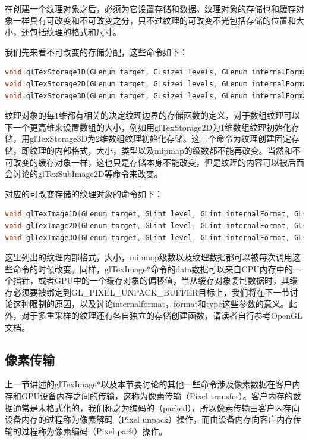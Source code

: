 在创建一个纹理对象之后，必须为它设置存储和数据。纹理对象的存储也和缓存对象一样具有可改变和不可改变之分，只不过纹理的可改变不光包括存储的位置和大小，还包括纹理的格式和尺寸。

我们先来看不可改变的存储分配，这些命令如下：

\begin{lstlisting}[language=C++]
void glTexStorage1D(GLenum target, GLsizei levels, GLenum internalFormat, GLsizei width);
void glTexStorage2D(GLenum target, GLsizei levels, GLenum internalFormat, GLsizei width, GLsizei height);
void glTexStorage3D(GLenum target, GLsizei levels, GLenum internalFormat, GLsizei width, GLsizei height, GLsizei depth);
\end{lstlisting}

纹理对象的每1维都有相关的决定纹理边界的存储函数的定义，对于数组纹理可以下一个更高维来设置数组的大小，例如用glTexStorage2D为1维数组纹理初始化存储，用glTexStorage3D为2维数组纹理初始化存储。这三个命令为纹理创建固定存储，即纹理的内部格式，大小，类型以及mipmap的级数都不能再改变。当然和不可改变的缓存对象一样，这也只是存储本身不能改变，但是纹理的内容可以被后面会讨论的glTexSubImage2D等命令来改变。

对应的可改变存储的纹理对象的命令如下：

\begin{lstlisting}[language=C++]
void glTexImage1D(GLenum target, GLint level, GLint internalFormat, GLsizei width, GLint border, GLenum format, GLenum type, const void *data);
void glTexImage2D(GLenum target, GLint level, GLint internalFormat, GLsizei width, GLsizei height, GLint border, GLenum format, GLenum type, const void *data);
void glTexImage3D(GLenum target, GLint level, GLint internalFormat, GLsizei width,GLsizei height, GLsizei depth, GLint border, GLenum format, GLenum type, const void *data);
\end{lstlisting}

这里列出的纹理内部格式，大小，mipmap级数以及纹理数据都可以被每次调用这些命令的时候改变。同样，glTexImage*命令的data数据可以来自CPU内存中的一个指针，或者GPU中的一个缓存对象的偏移值，当从缓存对象复制数据时，其缓存必须要被绑定到GL\_PIXEL\_UNPACK\_BUFFER目标上，我们将在下一节讨论这种限制的原因，以及讨论internalformat，format和type这些参数的意义。此外，对于多重采样的纹理还有各自独立的存储创建函数，请读者自行参考OpenGL文档\cite{b:OpenGL4.5CoreProfile}。





\subsection{像素传输}
上一节讲述的glTexImage*以及本节要讨论的其他一些命令涉及像素数据在客户内存和GPU设备内存之间的传输，这称为像素传输（Pixel transfer）。客户内存的数据通常是未格式化的，我们称之为编码的（packed），所以像素传输由客户内存向设备内存的过程称为像素解码（Pixel unpack）操作，而由设备内存向客户内存传输的过程称为像素编码（Pixel pack）操作。

